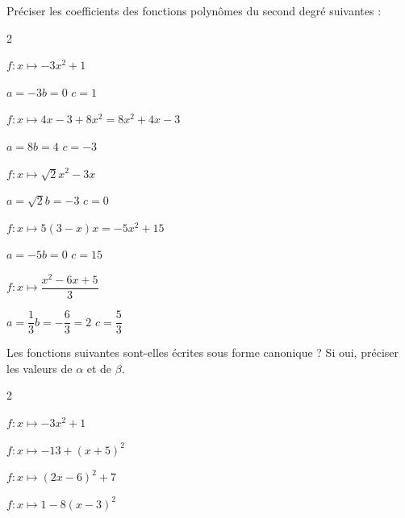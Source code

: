 \documentclass[11pt,a4paper]{article}  %
\begin{document}
	\graphicspath{{images/}}
	
	\begin{center}
		
		
	\end{center}



Préciser les coefficients des fonctions polynômes du second degré suivantes :


\begin{multicols}{2}
	\begin{enumMet}
		\item $f: x \mapsto-3 x^2+1$
		\begin{corrBox}
			$a=-3$\quad \quad \quad	$b=0$ \quad \quad \quad	$c=1$	
		\end{corrBox}
		\item $f: x \mapsto 4 x-3+8 x^2=8x^2+4x-3$
		\begin{corrBox}
			$a=8$\quad \quad \quad	$b=4$ \quad \quad \quad	$c=-3$	
		\end{corrBox}
		\item $f: x \mapsto \sqrt{2} x^2-3 x$
		\begin{corrBox}
			$a=\sqrt{2}$\quad \quad \quad	$b=-3$ \quad \quad \quad	$c=0$	
		\end{corrBox}
		\item $f: x \mapsto 5(3-x) x=-5x^2+15$
		\begin{corrBox}
			$a=-5$\quad \quad \quad	$b=0$ \quad \quad \quad	$c=15$	
		\end{corrBox}
		\item $f: x \mapsto \dfrac{x^2-6 x+5}{3}$
		\begin{corrBox}
			$a=\dfrac{1}{3}$\quad \quad \quad	$b=-\dfrac{6}{3}=2$ \quad \quad \quad	$c=\dfrac{5}{3}$	
		\end{corrBox}
	\end{enumMet}
\end{multicols}




Les fonctions suivantes sont-elles écrites sous forme canonique ? Si oui, préciser les valeurs de $\alpha$ et de $\beta$.
\begin{multicols}{2}
	\begin{enumMet}
		\item $f: x \mapsto-3 x^2+1$
		\item $f: x \mapsto-13+(x+5)^2$
		\item $f: x \mapsto(2 x-6)^2+7$
		\item $f: x \mapsto 1-8(x-3)^2$
	\end{enumMet}
\end{multicols}
\end{document}
